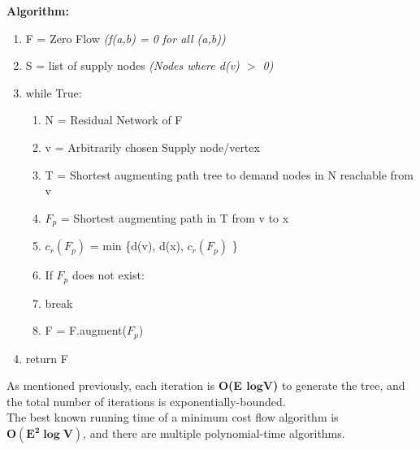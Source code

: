 \newpage
\textbf{Algorithm:}
\begin{enumerate}[label=\Alph*]
    \item F = Zero Flow \emph{(f(a,b) = 0 for all (a,b))}
    \item S = list of supply nodes \emph{(Nodes where d(v) $>$ 0)}
    \item while True: 
\begin{enumerate}[label=\arabic*]
    \item N = Residual Network of F
    \item v = Arbitrarily chosen Supply node/vertex
    \item T = Shortest augmenting path tree to demand nodes in N reachable from v 
    \item $F_p$ = Shortest augmenting path in T from v to x
    \item $c_r(F_p)$ = min \{d(v), d(x), $c_r(F_p)$ \}
    \item If $F_p$ does not exist:
    \item [] \quad break
    \item F = F.augment($F_p$)
\end{enumerate}  
\item return F
\end{enumerate}
As mentioned previously, each iteration is \textbf{O(E $\boldsymbol{log}$V)} to generate the tree, and the total number of iterations is exponentially-bounded. \\
The best known running time of a minimum cost flow algorithm is $\boldsymbol{O(E^2 \log V)}$, and there are multiple polynomial-time algorithms.